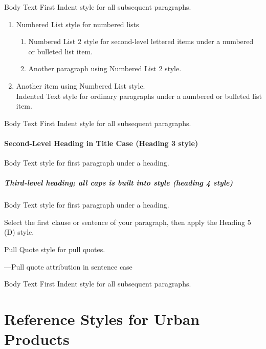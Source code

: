 \documentclass{urban-formatting}
\begin{document}
\noindent Body Text First Indent style for all subsequent paragraphs.

\begin{enumerate}
    \item Numbered List style for numbered lists
    \begin{enumerate}
        \item Numbered List 2 style for second-level lettered items under a numbered or bulleted list item.
        \item Another paragraph using Numbered List 2 style.
    \end{enumerate}
    \item Another item using Numbered List style.\\
    Indented Text style for ordinary paragraphs under a numbered or bulleted list item.
\end{enumerate}

\noindent Body Text First Indent style for all subsequent paragraphs.

\subsection{Second-Level Heading in Title Case (Heading 3 style)}

\indent Body Text style for first paragraph under a heading.

\subsubsection{Third-level heading; all caps is built into style (heading 4 style)}

Body Text style for first paragraph under a heading.

 Select the first clause or sentence of your paragraph, then apply the Heading 5 (D) style. 

Pull Quote style for pull quotes.

---Pull quote attribution in sentence case

Body Text First Indent style for all subsequent paragraphs.


\newpage
\part{Reference Styles for Urban Products}
\end{document}
